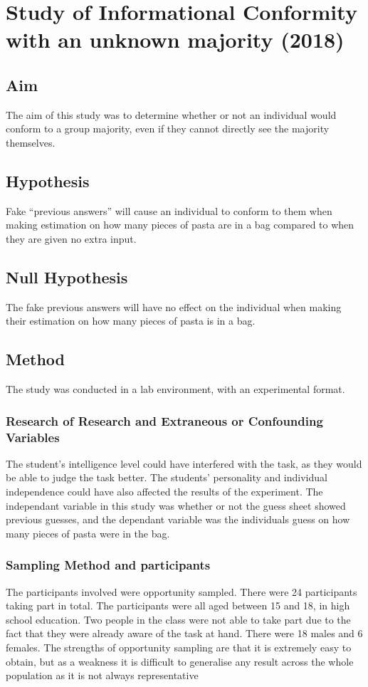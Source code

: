 \documentclass{report}
\begin{document}
\chapter{Study of Informational Conformity with an unknown majority (2018)}
\section {Aim}
The aim of this study was to determine whether or not an individual would conform to a group majority, even if they cannot directly see the majority themselves.
\section{Hypothesis}
Fake “previous answers” will cause an individual to conform to them when making estimation on how many pieces of pasta are in a bag compared to when they are given no extra input.

\section{Null Hypothesis}
The fake previous answers will have no effect on the individual when making their estimation on how many pieces of pasta is in a bag.
\section {Method}
The study was conducted in a lab environment, with an experimental format.
\subsection{Research of Research and Extraneous or Confounding Variables}
The student’s intelligence level could have interfered with the task, as they would be able to judge the task better. The students’ personality and individual independence could have also affected the results of the experiment. The independant variable in this study was whether or not the guess sheet showed previous guesses, and the dependant variable was the individuals guess on how many pieces of pasta were in the bag.
\subsection{Sampling Method and participants}
The participants involved were opportunity sampled. There were 24 participants taking part in total. The participants were all aged between 15 and 18, in high school education. Two people in the class were not able to take part due to the fact that they were already aware of the task at hand. There were 18 males and 6 females. The strengths of opportunity sampling are that it is extremely easy to obtain, but as a weakness it is difficult to generalise any result across the whole population as it is not always representative
\end{document}
